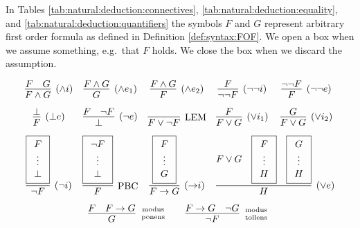 
In Tables \ref{tab:natural:deduction:connectives}, \ref{tab:natural:deduction:equality}, and \ref{tab:natural:deduction:quantifiers} 
the symbols $F$ and $G$ represent arbitrary first order formula as defined in Definition \vref{def:syntax:FOF}. 
We open a box when we assume something, e.g.~that $F$ holds. We close the box when we discard the assumption. 

\begin{table}[hbt]
\begin{gather*}
\begin{array}{ccccc}
\infer[(\land i)]{F\land G}{F & G} 
&
\infer[(\land e_1)]{G}{F \land G} 
&
\infer[(\land e_2)]{F}{F \land G}
&
\infer[(\lnot\lnot i)]{\lnot\lnot F}{F} 
&
\infer[(\lnot\lnot e)]{F}{\lnot\lnot F}
\\[0.7em]
\infer[(\bot e)]{F}{\bot}
&
\infer[(\lnot e)]{\bot}{F & \lnot F}
&
\infer[\text{LEM}]{F\lor\lnot F}{}
&
\infer[(\lor i_1)]{F\lor G}{F}
&
\infer[(\lor i_2)]{F\lor G}{G}
\\[0.7em]
\infer[(\lnot i)]{\lnot F}{
	\boxed{\begin{array}{c}F\\\vdots\\\bot\end{array}}}
&
\infer[\text{PBC}]{F}{
	\boxed{\begin{array}{c}\lnot F\\\vdots\\\bot\end{array}}}
&
\infer[({\limp} i)]{F\limp G}{
	\boxed{\begin{array}{c}F\\\vdots\\G\end{array}
}}
&
\multicolumn{2}{l}{
	\infer[(\lor e)]{H}{
		F\lor G &
		\boxed{\begin{array}{c}F\\\vdots\\H\end{array}} &
		\boxed{\begin{array}{c}G\\\vdots\\H\end{array}}
	}	
}
\\[0.7em]
&
\multicolumn{3}{r}{
\infer[\text{modus}\atop\text{ponens}]{G}{F & F\limp G}
\qquad
\infer[\text{modus}\atop\text{tollens}]{\lnot F}{F\limp G & \lnot G}
}
&
\end{array}
\end{gather*}
\caption{Natural Deduction Rules for Connectives}
\label{tab:natural:deduction:connectives}
\end{table}
